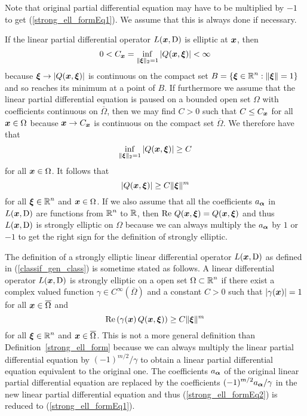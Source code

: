 Note that original partial differential equation may have to be
multiplied by $-1$ to get (\ref{strong_ell_formEq1}).  We assume that
this is always done if necessary.

\begin{rmk}
If the linear partial differential operator $L({\bm{x}}, \operatorname{D})$
is elliptic at ${\bm{x}}$, then         \label{ell_implies_strong_ell}
\[
0 < C_{{\bm{x}}}
= \inf_{\|{\bm{\xi}}\|_2 = 1} \left| Q({\bm{x}}, {\bm{\xi}}) \right| < \infty
\]
because ${\bm{\xi}} \to |Q({\bm{x}},{\bm{\xi}})|$ is continuous on the
compact set $\displaystyle B= \{{\bm{\xi}}\in \mathbb{R}^n : \|{\bm{\xi}}\| = 1\}$
and so reaches its minimum at a point of $B$.  If furthermore we
assume that the linear partial differential equation is paused on a
bounded open set $\Omega$ with coefficients continuous on
$\overline{\Omega}$,  then we may find $C>0$ such that $C \leq
C_{{\bm{x}}}$ for all ${\bm{x}} \in \Omega$ because ${\bm{x}} \to
C_{{\bm{x}}}$ is continuous on the compact set $\overline{\Omega}$.  We
therefore have that
\[
  \inf_{\|{\bm{\xi}}\|_2 = 1} \left| Q({\bm{x}}, {\bm{\xi}}) \right| \geq  C
\]
for all ${\bm{x}} \in \Omega$.  It follows that
\[
  \left| Q({\bm{x}}, {\bm{\xi}}) \right| \geq  C \|{\bm{\xi}}\|^m
\]
for all $\displaystyle {\bm{\xi}} \in \mathbb{R}^n$ and ${\bm{x}} \in \Omega$.
If we also assume that all the coefficients $a_{{\bm{\alpha}}}$ in
$L({\bm{x}},\operatorname{D})$ are functions from $\displaystyle \mathbb{R}^n$ to $\mathbb{R}$, then
$\operatorname{Re}\, Q({\bm{x}}, {\bm{\xi}}) = Q({\bm{x}}, {\bm{\xi}})$ and thus
$L({\bm{x}}, \operatorname{D})$ is strongly elliptic on $\Omega$
because we can always multiply the $a_{{\bm{\alpha}}}$ by $1$ or $-1$ to get
the right sign for the definition of strongly elliptic.
\end{rmk}

\begin{rmk}
The definition of a strongly elliptic linear differential operator
$L({\bm{x}}, \operatorname{D})$ as defined in (\ref{classif_gen_class}) is
sometime stated as follows.  A linear differential operator
$L({\bm{x}}, \operatorname{D})$ is strongly elliptic on a open
set $\displaystyle \Omega \subset \mathbb{R}^n$ if there exist a complex
valued function
$\displaystyle \gamma \in C^\infty(\overline{\Omega})$ and a constant $C>0$ such
that $|\gamma({\bm{x}})|=1$ for all ${\bm{x}} \in \overline{\Omega}$ and
\begin{equation} \label{strong_ell_formEq2}
\operatorname{Re}\left(\gamma({\bm{x}})\, Q({\bm{x}},{\bm{\xi}})\right) \geq C
\|{\bm{\xi}}\|^m
\end{equation}
for all $\displaystyle {\bm{\xi}} \in \mathbb{R}^n$ and
${\bm{x}} \in \overline{\Omega}$.
This is not a more general definition than Definition~\ref{strong_ell_form}
because we can always multiply the linear partial differential
equation by $\displaystyle (-1)^{m/2}/\gamma$ to obtain a linear partial
differential equation equivalent to the original one.  The
coefficients $a_{{\bm{\alpha}}}$ of the original linear partial differential
equation are replaced by the coefficients
$\displaystyle (-1)^{m/2} a_{{\bm{\alpha}}}/\gamma$ in the new linear partial
differential equation and thus
(\ref{strong_ell_formEq2}) is reduced to (\ref{strong_ell_formEq1}).
\end{rmk}

